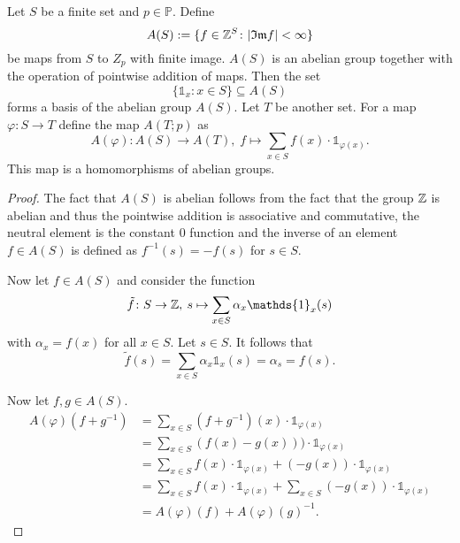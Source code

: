 \begin{cons}
  Let $S$ be a finite set and $p \in \mathbb{P}$. Define \[A(S) := \{f \in \mathbb{Z}^S\colon |\mathfrak{Im} f| < \infty \}\] be maps from $S$ to $Z_p$ with finite image. $A(S)$ is an abelian group together with the operation of pointwise addition of maps.
  Then the set \[\{\mathds{1}_x\colon x\in S\} \subseteq A(S)\] forms a basis of the abelian group $A(S)$.
  Let $T$ be another set. For a map $\varphi\colon S \to T$ define the map $A(T; p)$ as
  \begin{equation*}
    A(\varphi)\colon A(S) \to A(T),\; f \mapsto \sum\limits_{x \in S}f(x)\cdot \mathds{1}_{\varphi(x)}.
  \end{equation*}
  This map is a homomorphisms of abelian groups.
\end{cons}

\begin{proof} 
  The fact that $A(S)$ is abelian follows from the fact that the group $\mathbb{Z}$ is abelian and thus the pointwise addition is associative and commutative, the neutral element is the constant $0$ function and the inverse of an element $f \in A(S)$ is defined as $f^{-1}(s) = -f(s)$ for $s \in S$.

  Now let $f \in A(S)$ and consider the function \[\tilde{f}\colon S \to \Z, \: s \mapsto \sum\limits_{x\in S} \alpha_x \mathds{1}_x(s)\] with $\alpha_x = f(x)$ for all $x \in S$. Let $s \in S$. It follows that
  \begin{equation*}
    \tilde{f}(s) = \sum\limits_{x \in S} \alpha_x \mathds{1}_x(s) = \alpha_s = f(s).
  \end{equation*}

  Now let $f,g \in A(S)$.
  \begin{align*}
    A(\varphi)(f+g^{-1}) &= \sum\limits_{x\in S} (f+g^{-1})(x)\cdot \mathds{1}_{\varphi(x)} \\
                        &= \sum\limits_{x\in S} (f(x)-g(x)))\cdot \mathds{1}_{\varphi(x)} \\
                        &= \sum\limits_{x\in S} f(x)\cdot\mathds{1}_{\varphi(x)} + (-g(x))\cdot \mathds{1}_{\varphi(x)} \\
                        &= \sum\limits_{x\in S} f(x)\cdot\mathds{1}_{\varphi(x)} + \sum\limits_{x\in S} (-g(x))\cdot \mathds{1}_{\varphi(x)} \\
                        &= A(\varphi)(f) + A(\varphi)(g)^{-1}.  
  \end{align*}
\end{proof}

